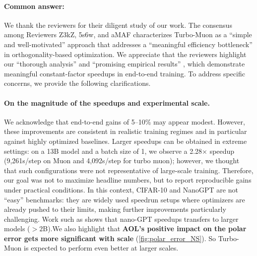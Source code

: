 
\rebuttal

\showcommentstrue %

% 

\title{\paperTitle}
\maketitle
\thispagestyle{empty}
\appendix

\paragraph{Common answer:} We thank the reviewers for their diligent study of our work. The consensus among Reviewers Z3kZ, 5s6w, and aMAF characterizes Turbo-Muon as a ``simple and well-motivated'' approach that addresses a ``meaningful efficiency bottleneck'' in orthogonality-based optimization. We appreciate that the reviewers highlight our ``thorough analysis'' and ``promising empirical results'' , which demonstrate meaningful constant-factor speedups in end-to-end training. 
To address specific concerns, we provide the following clarifications.

\paragraph{On the magnitude of the speedups and experimental scale.}
We acknowledge that end-to-end gains of 5–10\% may appear modest. However, these improvements are consistent in realistic training regimes and in particular against highly optimized baselines. Larger speedups can be obtained in extreme settings: on a 13B model and a batch size of 1, we observe a 2.28$\times$ speedup (9,261s/step on Muon and 4,092s/step for turbo muon); however, 
we thought that such configurations were
not representative of large-scale training. Therefore, our goal was not to maximize  headline numbers, but to report reproducible gains under practical conditions. In this context, CIFAR-10 and NanoGPT are not “easy” benchmarks: they are widely used speedrun setups where optimizers are already pushed to their limits, making further improvements particularly challenging. Work such as \cite{rebb_nanochat} shows that nano-GPT speedups transfers to larger models ($>2$B).We also highlight that \textbf{AOL's positive impact on the polar error gets more significant with scale} (\cref{fig:polar_error_NS}). So Turbo-Muon is expected to perform even better at larger scales.

